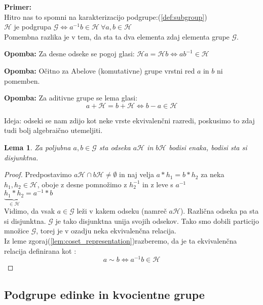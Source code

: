 \documentclass[a4paper]{article}
\newcounter{environment:definition_counter}
\newcounter{environment:theorem_counter}
\newcounter{environment:statement_counter}
\newcounter{example:example_counter}
\newenvironment{example}
{\textbf{Primer:}\\}
{\setcounter{example:example_counter}{0}}
\newenvironment{remark}
{\textbf{Opomba:}}
{}
\newtheorem{lemma}{Lema}
\begin{document}
\begin{example}
Hitro nas to spomni na karakterizacijo podgrupe:(\ref{def:subgroup})\\
$\mathcal{H}$ je podgrupa $\mathcal{G} \iff a^{-1}b \in \mathcal{H} \ \forall a,b \in \mathcal{H}$\\
Pomembna razlika je v tem, da sta ta dva elementa zdaj elementa grupe $\mathcal{G}$.

\begin{remark}
Za desne odseke se pogoj glasi: $\mathcal{H}a = \mathcal{H}b \iff ab^{-1} \in \mathcal{H}$
\end{remark}

\begin{remark}
Očitno za Abelove (komutativne) grupe vrstni red $a$ in $b$ ni pomemben.
\end{remark}

\begin{remark}
Za aditivne grupe se lema glasi:
$$a + \mathcal{H} = b + \mathcal{H} \iff b - a \in \mathcal{H}$$
\end{remark}


\end{example}

Ideja: odseki se nam zdijo kot neke vrste ekvivalenčni razredi, poskusimo to zdaj tudi bolj algebraično utemeljiti.

\begin{lemma}
Za poljubna $a, b \in \mathcal{G}$ sta odseka $a\mathcal{H}$ in $b\mathcal{H}$ bodisi enaka, bodisi sta si disjunktna.
\end{lemma}

\begin{proof}
Predpostavimo $a\mathcal{H} \cap b\mathcal{H} \neq \emptyset$ in naj velja $a*h_1 = b*h_2$ za neka $h_1, h_2 \in \mathcal{H}$, oboje z desne pomnožimo z $h_2^{-1}$ in z leve s $a^{-1}$\\
$\underbrace{h_1*h_2}_{\in \mathcal{H}} = a^{-1}*b$\\
Vidimo, da vsak $a \in\mathcal{G}$ leži v kakem odseku (namreč $a\mathcal{H}$). Različna odseka pa sta si disjunktna. $\mathcal{G}$ je tako disjunktna unija svojih odsekov. Tako smo dobili particijo množice $\mathcal{G}$, torej je v ozadju neka ekvivalenčna relacija.\\
Iz leme zgoraj(\ref{lem:coset_representation})razberemo, da je ta ekvivalenčna relacija definirana kot :
$$a \sim b \iff a^{-1}b \in \mathcal{H}$$

\end{proof}

\subsection{Podgrupe edinke in kvocientne grupe}
\end{document}
